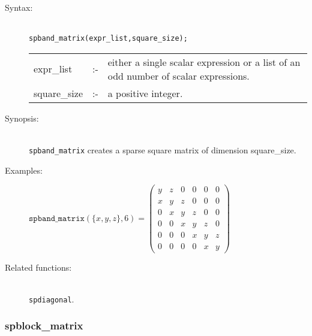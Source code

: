 \begin{description}
\item[Syntax:]\mbox{}\\
\texttt{spband\_matrix(expr\_list,square\_size);}\\[2mm]
\begin{tabular}{l l p{.72\linewidth}}
expr\_list  &:-& 
either a single scalar expression or a list of an odd number of scalar
expressions.\\
square\_size &:-& a positive integer.
\end{tabular}

\item[Synopsis:]\mbox{}\\
                \texttt{spband\_matrix} creates a sparse square matrix of 
                dimension square\_size. 

\item[Examples:]
\begin{flushleft}  
\begin{math}  
\texttt{spband\_matrix}(\{x,y,z\},6) = 
\begin{pmatrix} y & z & 0 & 0 & 0 & 0 \\ x & y & z & 0 & 0
& 0 \\ 0 & x & y & z & 0 & 0 \\ 0 & 0 & x & y & z & 0 \\ 0 & 0 & 0 & x &
 y & z \\ 0 & 0 & 0 & 0 & x & y 
\end{pmatrix} 
\end{math}  
\end{flushleft}

\item[Related functions:]\mbox{}\\
 \texttt{spdiagonal}.
\end{description}

\subsubsection{spblock\_matrix}
\label{sparse:spblock_matrix}

